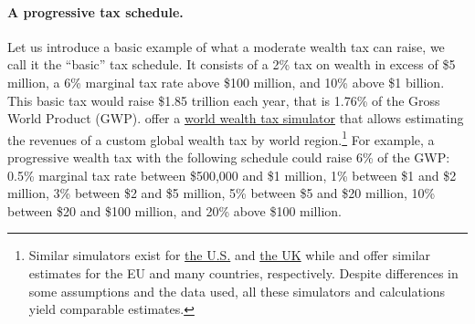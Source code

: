 \documentclass[12pt,english]{article}
\begin{document}
\paragraph{A progressive tax schedule.} %
Let us introduce a basic example of what a moderate wealth tax can raise, we call it the ``basic'' tax schedule. It consists of a 2\% tax on wealth in excess of \$5 million, a 6\% marginal tax rate above \$100 million, and 10\% above \$1 billion. This basic tax would raise \$1.85 trillion each year, that is 1.76\% of the Gross World Product (GWP). %
\citet{chancel_world_2022} offer a \href{https://wid.world/world-wealth-tax-simulator/}{world wealth tax simulator} that allows estimating the revenues of a custom global wealth tax by world region.\footnote{Similar simulators exist for \href{https://taxjusticenow.org/}{the U.S.} \citep{saez_triumph_2019} and \href{http://taxsimulator.ukwealth.tax/\#/appendix}{the UK} while \citet{kapeller_european_2021} and \citet{oxfam_taxing_2022} offer similar estimates for the EU and many countries, respectively. Despite differences in some assumptions and the data used, all these simulators and calculations yield comparable estimates.} 
For example, a progressive wealth tax with the following schedule could raise 6\% of the GWP: 0.5\% marginal tax rate between \$500,000 and \$1 million, 1\% between \$1 and \$2 million, 3\% between \$2 and \$5 million, 5\% between \$5 and \$20 million, 10\% between \$20 and \$100 million, and 20\% above \$100 million. %
\end{document}
